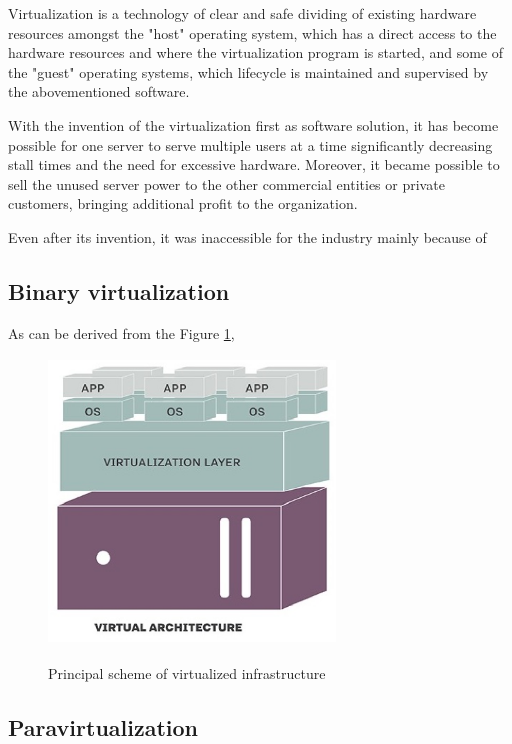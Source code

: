 \begin{definition}
Virtualization is a technology of clear and safe dividing
of existing hardware resources amongst the "host" operating system,
which has a direct access to the hardware resources and where the
virtualization program is started, and some of the "guest" operating systems,
which lifecycle is maintained and supervised by the abovementioned software.
\end{definition}

With the invention of the virtualization first as software solution,
it has become possible for one server to serve multiple users at a time
significantly decreasing stall times and the need for excessive hardware.
Moreover, it became possible to sell the unused
server power to the other commercial entities or private customers,
bringing additional profit to the organization.

Even after its invention, it was inaccessible
for the industry mainly because of

\subsection{Binary virtualization}

As can be derived from the Figure \ref{fig:TraditionalAndVirtualInfra1},

\begin{figure}
\includegraphics[height=3in, width=3in]{virtualized}
\caption{Principal scheme of virtualized infrastructure}
\cite{TraditionalAndVirtualInfra1}
\label{fig:TraditionalAndVirtualInfra1}
\end{figure}

\subsection{Paravirtualization}

